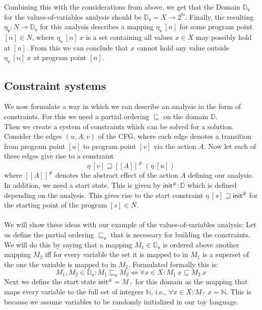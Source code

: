     Combining this with the considerations from above, we get that the Domain $\mathbb{D}_\textsf{v}$ for the values-of-variables analysis should be $\mathbb{D}_\textsf{v} = X \rightarrow 2^\mathbb{N}$. Finally, the resulting $\eta_\textsf{v}: N \rightarrow \mathbb{D}_\textsf{v}$ for this analysis describes a mapping $\eta_\textsf{v}\ [n]$ for some program point $[n] \in N$, where $\eta_\textsf{v}\ [n]\ x$ is a set containing all values $x \in X$ may possibly hold at $[n]$. From this we can conclude that $x$ cannot hold any value outside $\eta_\textsf{v}\ [n]\ x$ at program point $[n]$.

    \subsection{Constraint systems}
    We now formulate a way in which we can describe an analysis in the form of constraints. For this we need a partial ordering $\sqsubseteq$ on the domain $\mathbb{D}$.\\
    Then we create a system of constraints which can be solved for a solution. Consider the edges $(u, A, v)$ of the \ac{CFG}, where each edge denotes a transition from program point $[u]$ to program point $[v]$ via the action $A$. Now let each of these edges give rise to a constraint
    \[\eta\ [v] \sqsupseteq [\![A]\!]^{\#}\ (\eta\ [u])\]
    where $[\![A]\!]^{\#}$ denotes the abstract effect of the action $A$ defining our analysis. In addition, we need a start state. This is given by $\textsf{init}^{\#}: \mathbb{D}$ which is defined depending on the analysis. This gives rise to the start constraint $\eta\ [s] \sqsupseteq \textsf{init}^{\#}$ for the starting point of the program $[s] \in N$.\\
    \\
    We will show these ideas with our example of the values-of-variables analysis: Let us define the partial ordering $\sqsubseteq_\textsf{v}$ that is necessary for building the constraints. We will do this by saying that a mapping $M_1 \in \mathbb{D}_\textsf{v}$ is ordered above another mapping $M_2$ iff for every variable the set it is mapped to in $M_1$ is a superset of the one the variable is mapped to in $M_2$. Formulated formally this is:
    \[M_1, M_2 \in \mathbb{D}_\textsf{v}: M_1 \sqsubseteq_\textsf{v} M_2 \Longleftrightarrow \forall x \in X: M_1\ x \subseteq M_2\ x\]
    Next we define the start state $\textsf{init}^{\#} = M_\top$ for this domain as the mapping that maps every variable to the full set of integers $\mathbb{N}$, i.e., $\forall x \in X: M_\top\ x = \mathbb{N}$. This is because we assume variables to be randomly initialized in our toy language.\\
